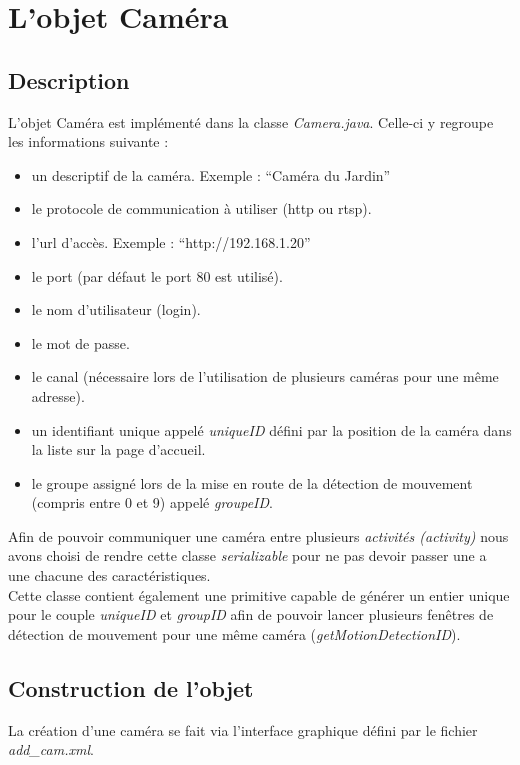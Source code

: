 \section{L'objet Caméra}
\subsection{Description}
L'objet Caméra est implémenté dans la classe \textit{Camera.java}.\newline
Celle-ci y regroupe les informations suivante : 
\begin{itemize} 
\item un descriptif de la caméra. Exemple : ``Caméra du Jardin''
\item le protocole de communication à utiliser (http ou rtsp).
\item l'url d'accès. Exemple : ``http://192.168.1.20''
\item le port (par défaut le port 80 est utilisé).
\item le nom d'utilisateur (login).
\item le mot de passe.
\item le canal (nécessaire lors de l'utilisation de plusieurs caméras pour une
même adresse).
\item un identifiant unique appelé \textit{uniqueID} défini par la position de
la caméra dans la liste sur la page d'accueil.
\item le groupe assigné lors de la mise en route de la détection de mouvement
(compris entre 0 et 9) appelé \textit{groupeID}.\\
\end{itemize}
\indent Afin de pouvoir communiquer une caméra entre plusieurs \textit{activités
(activity)} nous avons choisi de rendre cette classe \textit{serializable} pour
ne pas devoir passer une a une chacune des caractéristiques.\\
Cette classe contient également une primitive capable de générer un entier
unique pour le couple \textit{uniqueID} et \textit{groupID} afin de pouvoir
lancer plusieurs fenêtres de détection de mouvement pour une même caméra
(\textit{getMotionDetectionID}).
\subsection{Construction de l'objet}
La création d'une caméra se fait via l'interface graphique défini par le
fichier \textit{add\_cam.xml}.\newline


